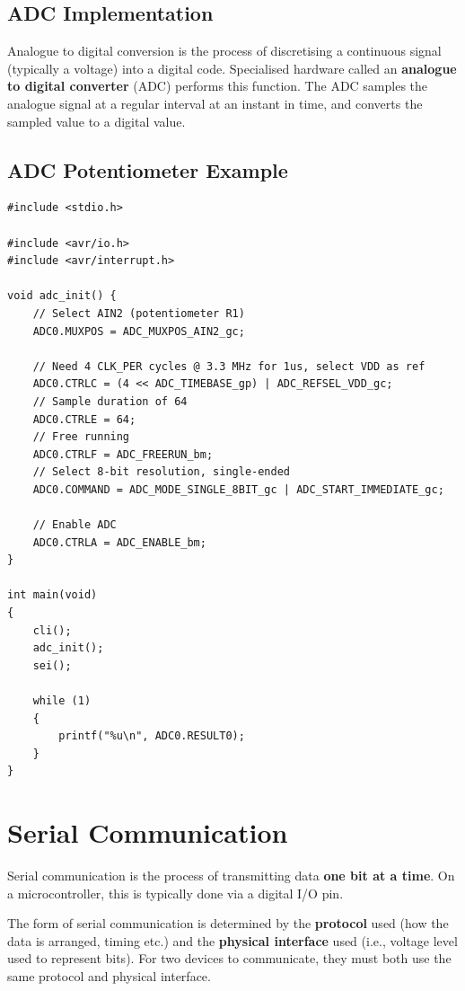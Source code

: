 \documentclass{report}
\begin{document}
\subsection{ADC Implementation}
Analogue to digital conversion is the process of discretising a continuous signal (typically a voltage)
into a digital code. Specialised hardware called an \textbf{analogue to digital converter} (ADC)
performs this function. The ADC samples the analogue signal at a regular interval at an instant in time, and
converts the sampled value to a digital value.
\subsection{ADC Potentiometer Example}
\begin{verbatim}
#include <stdio.h>

#include <avr/io.h>
#include <avr/interrupt.h>

void adc_init() {
    // Select AIN2 (potentiometer R1)
    ADC0.MUXPOS = ADC_MUXPOS_AIN2_gc;

    // Need 4 CLK_PER cycles @ 3.3 MHz for 1us, select VDD as ref
    ADC0.CTRLC = (4 << ADC_TIMEBASE_gp) | ADC_REFSEL_VDD_gc;
    // Sample duration of 64
    ADC0.CTRLE = 64;
    // Free running
    ADC0.CTRLF = ADC_FREERUN_bm;
    // Select 8-bit resolution, single-ended
    ADC0.COMMAND = ADC_MODE_SINGLE_8BIT_gc | ADC_START_IMMEDIATE_gc;

    // Enable ADC
    ADC0.CTRLA = ADC_ENABLE_bm;
}

int main(void)
{
    cli();
    adc_init();
    sei();

    while (1)
    {
        printf("%u\n", ADC0.RESULT0);
    }
}
\end{verbatim}
\section{Serial Communication}
Serial communication is the process of transmitting data \textbf{one bit at a time}.
On a microcontroller, this is typically done via a digital I/O pin.

The form of serial communication is determined by the \textbf{protocol} used (how the data is arranged, timing etc.)
and the \textbf{physical interface} used (i.e., voltage level used to represent bits).
For two devices to communicate, they must both use the same protocol and physical interface.
\end{document}
